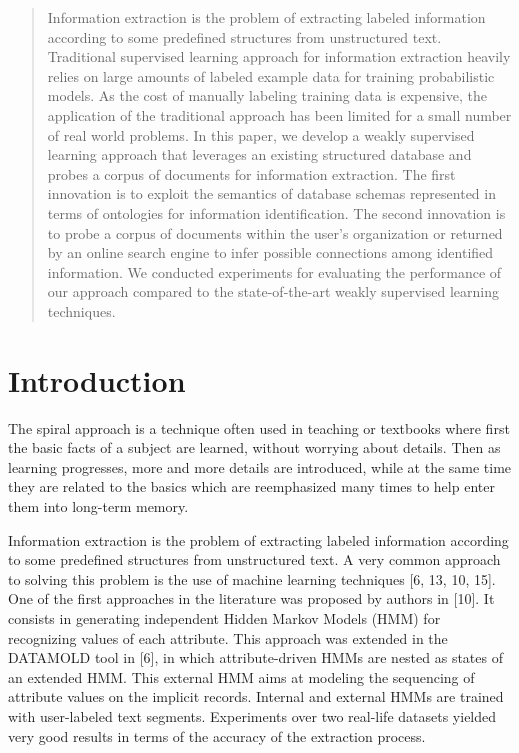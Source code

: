 \documentclass{sig-alternate}
\begin{document}
\maketitle



%
%
\begin{abstract}
Information extraction is the problem of extracting labeled information according to some 
predefined structures from unstructured text. Traditional supervised learning approach 
for information extraction heavily relies on large amounts of labeled example data for 
training probabilistic models. As the cost of manually labeling training data is expensive, 
the application of the traditional approach has been limited for a small number of real world 
problems. In this paper, we develop a weakly supervised learning approach that leverages 
an existing structured database and probes a corpus of documents for information extraction. 
The first innovation is to exploit the semantics of database schemas represented in terms of 
ontologies for information identification.  The second innovation is to probe a corpus of 
documents within the user's organization or returned by an online search engine to infer 
possible connections among identified information. We conducted experiments for evaluating 
the performance of our approach compared to the state-of-the-art weakly 
supervised learning techniques.  


\end{abstract}

%
%
\section{Introduction}
The spiral approach is a technique often used in teaching or textbooks where first the basic facts of a subject are learned, without worrying about details. 
Then as learning progresses, more and more details are introduced, while at the same time they are related to the basics 
which are reemphasized many times to help enter them into long-term memory. 

Information extraction is the problem of extracting labeled information according to some predefined structures from 
unstructured text. A very common approach to solving this problem is the use of machine learning techniques [6, 13, 10, 15]. 
One of the first approaches in the literature was proposed by authors in [10]. It consists in generating independent Hidden Markov 
Models (HMM) for recognizing values of each attribute. This approach was extended in the DATAMOLD tool in [6], in which 
attribute-driven HMMs are nested as states of an extended HMM. This external HMM aims at modeling the sequencing of 
attribute values on the implicit records. Internal and external HMMs are trained with user-labeled text segments. Experiments 
over two real-life datasets yielded very good results in terms of the accuracy of the extraction process. 
\end{document}
